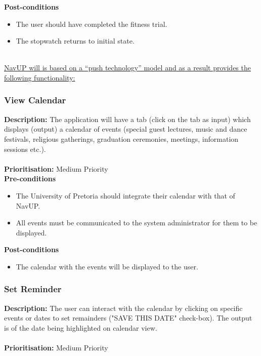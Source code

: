 \documentclass[runningheads,a4paper]{article}
\begin{document}
\textbf{Post-conditions}
\begin{itemize}
  	\item The user should have completed the fitness trial.
	\item The stopwatch returns to initial state.
\end{itemize}

\noindent \\ \underline{NavUP will is based on a “push technology” model and as a result provides the following functionality:}

\subsubsection{View Calendar}

\textbf{Description:} The application will have a tab (click on the tab as input) which displays (output) a calendar of events (special guest lectures, music and dance festivals, religious gatherings, graduation ceremonies, meetings, information sessions etc.).\\\\
\noindent
\textbf{Prioritisation:} Medium Priority\\
  
  
\textbf{Pre-conditions}
\begin{itemize}
	\item The University of Pretoria should integrate their calendar with that of NavUP.
	\item All events must be communicated to the system administrator for them to be displayed.
\end{itemize}
  
\textbf{Post-conditions}
\begin{itemize}
  	\item The calendar with the events will be displayed to the user.
\end{itemize}

\subsubsection{Set Reminder}

\textbf{Description:} The user can interact with the calendar by clicking on specific events or dates to set remainders ("SAVE THIS DATE" check-box). The output is of the date being highlighted on calendar view.\\\\
\noindent
\textbf{Prioritisation:} Medium Priority\\
  
\end{document}
